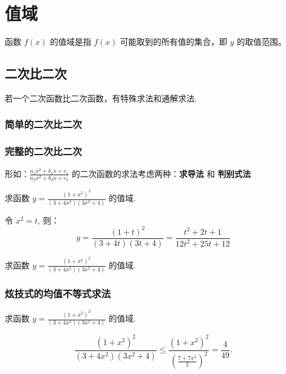 \section{值域}

\begin{definition}[值域]
    函数 $f(x)$ 的值域是指 $f(x)$ 可能取到的所有值的集合，即 $y$ 的取值范围。
\end{definition}

\subsection{二次比二次}

\begin{definition}
    若一个二次函数比二次函数，有特殊求法和通解求法.
\end{definition}

\subsubsection{简单的二次比二次}

\subsubsection{完整的二次比二次}

\begin{theorem}[完整的二次比二次]
    形如：$\frac{a_1x^2 + b_1x + c_1}{a_2x^2 + b_2x + c_2}$ 的二次函数的求法考虑两种：\textbf{求导法} 和 \textbf{判别式法}
\end{theorem}

\begin{example}[求导法]
    求函数 $y = \frac{(1+x^2)^2}{(3+4x^2)(3x^2+4)}$ 的值域.
\end{example}

\begin{solution}
    令 $x^2=t$, 则：
    $$y=\frac{(1+t)^2}{(3+4 t)(3 t+4)}=\frac{t^2+2 t+1}{12 t^2+25 t+12}$$
\end{solution}

\begin{example}[判别式法]
    求函数 $y = \frac{(1+x^2)^2}{(3+4x^2)(3x^2+4)}$ 的值域.
\end{example}

\begin{solution}

\end{solution}

\subsubsection{炫技式的均值不等式求法}

\begin{example}[均值不等式求法]
    求函数 $y = \frac{(1+x^2)^2}{(3+4x^2)(3x^2+4)}$ 的值域.
\end{example}

\begin{solution}
    $$
        \frac{\left(1+x^2\right)^2}{\left(3+4 x^2\right)\left(3 x^2+4\right)} \leqslant \frac{\left(1+x^2\right)^2}{\left(\frac{7+7 x^2}{2}\right)^2}=\frac{4}{49} .
    $$
\end{solution}

